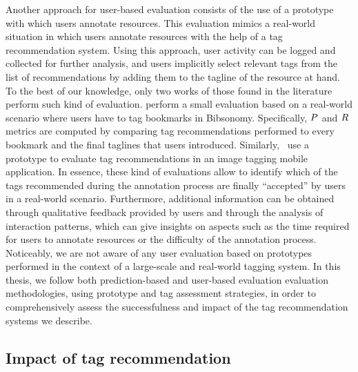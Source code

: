 Another approach for user-based evaluation consists of the use of a prototype with which users annotate resources. 
This evaluation mimics a real-world situation in which users annotate resources with the help of a tag recommendation system. 
Using this approach, user activity can be logged and collected for further analysis, and users implicitly select relevant tags from the list of recommendations by adding them to the tagline of the resource at hand.
To the best of our knowledge, only two works of those found in the literature perform such kind of evaluation.
\cite{Jaschke2009} perform a small evaluation based on a real-world scenario where users have to tag bookmarks in Bibsonomy. Specifically, $P$ and $R$ metrics are computed by comparing tag recommendations performed to every bookmark and the final taglines that users introduced.
Similarly,~\cite{Naaman2008} use a prototype to evaluate tag recommendations in an image tagging mobile application.
In essence, these kind of evaluations allow to identify which of the tags recommended during the annotation process are finally ``accepted'' by users in a real-world scenario. Furthermore, additional information can be obtained through qualitative feedback provided by users and through the analysis of interaction patterns, which can give insights on aspects such as the time required for users to annotate resources or the difficulty of the annotation process.
Noticeably, we are not aware of any user evaluation based on prototypes performed in the context of a large-scale and real-world tagging system.
In this thesis, we follow both prediction-based and user-based evaluation evaluation methodologies, using prototype and tag assessment strategies, in order to comprehensively assess the successfulness and impact of the tag recommendation systems we describe.


\subsection{Impact of tag recommendation}
\label{sec:soa:impact_tag_recommendation}

